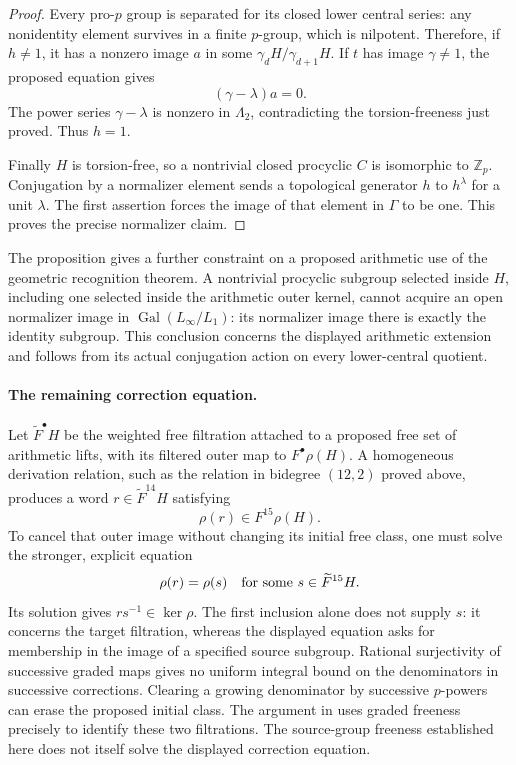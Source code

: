 \documentclass[11pt]{article}
\theoremstyle{definition}\newtheorem{definition}[theorem]{Definition}
\begin{document}
\begin{proof}
Every pro-\(p\) group is separated for its closed lower central
series: any nonidentity element survives in a finite \(p\)-group,
which is nilpotent.  Therefore, if \(h\neq1\), it has a nonzero
image \(a\) in some
\(\gamma_dH/\gamma_{d+1}H\).  If \(t\) has image
\(\gamma\neq1\), the proposed equation gives
\[
                         (\gamma-\lambda)a=0 .
\]
The power series \(\gamma-\lambda\) is nonzero in
\(\Lambda_2\), contradicting the torsion-freeness just proved.
Thus \(h=1\).

Finally \(H\) is torsion-free, so a nontrivial closed
procyclic \(C\) is isomorphic to \(\mathbb Z_p\).
Conjugation by a normalizer element sends a topological
generator \(h\) to \(h^\lambda\) for a unit \(\lambda\).
The first assertion forces the image of that element in
\(\Gamma\) to be one.  This proves the precise normalizer
claim.
\end{proof}

The proposition gives a further constraint on a proposed
arithmetic use of the geometric recognition theorem.  A
nontrivial procyclic subgroup selected inside \(H\), including
one selected inside the arithmetic outer kernel, cannot
acquire an open normalizer image in
\(\operatorname{Gal}(L_\infty/L_1)\): its normalizer image
there is exactly the identity subgroup.  This conclusion
concerns the displayed arithmetic extension and follows from
its actual conjugation action on every lower-central quotient.

\paragraph{The remaining correction equation.}
Let \(\widetilde F^\bullet H\) be the weighted free filtration
attached to a proposed free set of arithmetic lifts, with its
filtered outer map to \(F^\bullet\rho(H)\).
A homogeneous derivation relation, such as the relation in
bidegree \((12,2)\) proved above, produces a word
\(r\in\widetilde F^{14}H\) satisfying
\[
 \rho(r)\in F^{15}\rho(H).
\]
To cancel that outer image without changing its initial
free class, one must solve the stronger, explicit equation
\[
 \rho(r)=\rho(s)\quad\hbox{for some }s\in\widetilde F^{15}H.
\]
Its solution gives \(rs^{-1}\in\ker\rho\).
The first inclusion alone does not supply \(s\):
it concerns the target filtration, whereas the displayed equation
asks for membership in the image of a specified source subgroup.
Rational surjectivity of successive graded maps gives no
uniform integral bound on the denominators in successive
corrections.  Clearing a growing denominator by successive
\(p\)-powers can erase the proposed initial class.
The argument in \cite[proof of Theorem 2.14, p.~27]{Ishii} uses graded
freeness precisely to identify these two filtrations.
The source-group freeness established here does not itself
solve the displayed correction equation.
\end{document}
